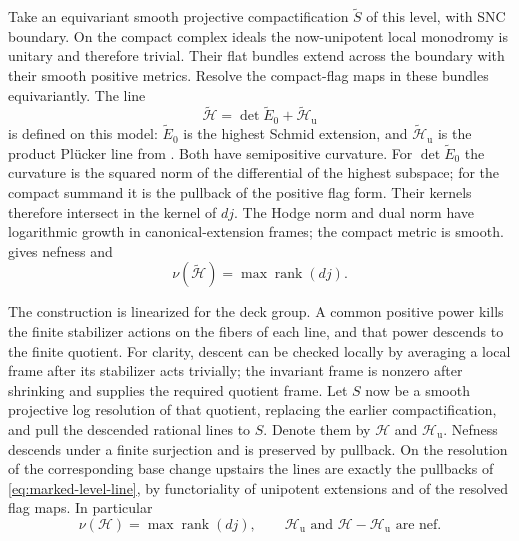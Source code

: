 Take an equivariant smooth projective compactification
$\widetilde S$ of this level, with SNC boundary.  On the compact
complex ideals the now-unipotent local monodromy is unitary and
therefore trivial.  Their flat bundles extend across the
boundary with their smooth positive metrics.  Resolve the
compact-flag maps in these bundles equivariantly.  The line
\begin{equation}\label{eq:marked-level-line}
 \widetilde{\mathcal H}
   =\det\widetilde E_0+\widetilde{\mathcal H}_{\mathrm u}
\end{equation}
is defined on this model: $\widetilde E_0$ is the highest
Schmid extension, and
$\widetilde{\mathcal H}_{\mathrm u}$ is the product Plücker
line from .  Both have semipositive
curvature.  For $\det\widetilde E_0$ the curvature is the
squared norm of the differential of the highest subspace; for
the compact summand it is the pullback of the positive flag
form.  Their kernels therefore intersect in the kernel of $dj$.
The Hodge norm and dual norm have logarithmic growth in
canonical-extension frames; the compact metric is smooth.
 gives nefness and
\begin{equation}\label{eq:marked-nef-rank}
 \nu(\widetilde{\mathcal H})
   =\max\operatorname{rank}(dj).
\end{equation}

The construction is linearized for the deck group.  A common
positive power kills the finite stabilizer actions on the
fibers of each line, and that power descends to the finite
quotient.  For clarity, descent can be checked locally by
averaging a local frame after its stabilizer acts trivially;
the invariant frame is nonzero after shrinking and supplies
the required quotient frame.  Let $S$ now be a smooth
projective log resolution of that quotient, replacing the
earlier compactification, and pull the descended rational
lines to $S$.  Denote them by $\mathcal H$ and
$\mathcal H_{\mathrm u}$.  Nefness descends under a finite
surjection and is preserved by pullback.  On the resolution
of the corresponding base change upstairs the lines are
exactly the pullbacks of \eqref{eq:marked-level-line}, by
functoriality of unipotent extensions and of the resolved flag
maps.  In particular
\begin{equation}\label{eq:marked-downstairs-rank}
 \nu(\mathcal H)=\max\operatorname{rank}(dj),
 \qquad
 \mathcal H_{\mathrm u}\text{ and }
 \mathcal H-\mathcal H_{\mathrm u}\text{ are nef}.
\end{equation}


